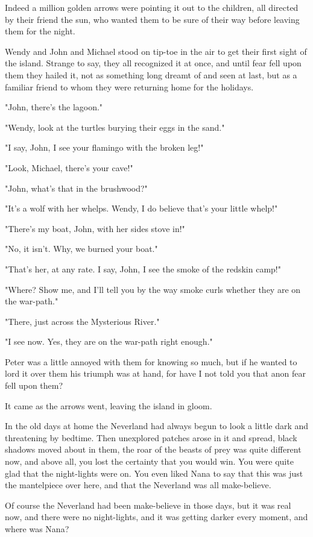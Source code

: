 Indeed a million golden arrows were pointing it out to the children, all
directed by their friend the sun, who wanted them to be sure of their way
before leaving them for the night.


Wendy and John and Michael stood on tip-toe in the air to get their first
sight of the island. Strange to say, they all recognized it at once, and
until fear fell upon them they hailed it, not as something long dreamt of
and seen at last, but as a familiar friend to whom they were returning
home for the holidays.


"John, there's the lagoon."


"Wendy, look at the turtles burying their eggs in the sand."


"I say, John, I see your flamingo with the broken leg!"


"Look, Michael, there's your cave!"


"John, what's that in the brushwood?"


"It's a wolf with her whelps. Wendy, I do believe that's your little
whelp!"


"There's my boat, John, with her sides stove in!"


"No, it isn't. Why, we burned your boat."


"That's her, at any rate. I say, John, I see the smoke of the redskin
camp!"


"Where? Show me, and I'll tell you by the way smoke curls whether they are
on the war-path."


"There, just across the Mysterious River."


"I see now. Yes, they are on the war-path right enough."


Peter was a little annoyed with them for knowing so much, but if he wanted
to lord it over them his triumph was at hand, for have I not told you that
anon fear fell upon them?


It came as the arrows went, leaving the island in gloom.


In the old days at home the Neverland had always begun to look a little
dark and threatening by bedtime. Then unexplored patches arose in it and
spread, black shadows moved about in them, the roar of the beasts of prey
was quite different now, and above all, you lost the certainty that you
would win. You were quite glad that the night-lights were on. You even
liked Nana to say that this was just the mantelpiece over here, and that
the Neverland was all make-believe.


Of course the Neverland had been make-believe in those days, but it was
real now, and there were no night-lights, and it was getting darker every
moment, and where was Nana?


